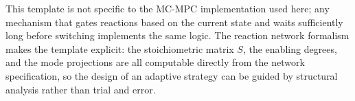 This template is not specific to the MC-MPC implementation used here; any
mechanism that gates reactions based on the current state and waits
sufficiently long before switching implements the same logic.  The reaction
network formalism makes the template explicit: the stoichiometric matrix $S$,
the enabling degrees, and the mode projections are all computable directly from
the network specification, so the design of an adaptive strategy can be guided
by structural analysis rather than trial and error.
